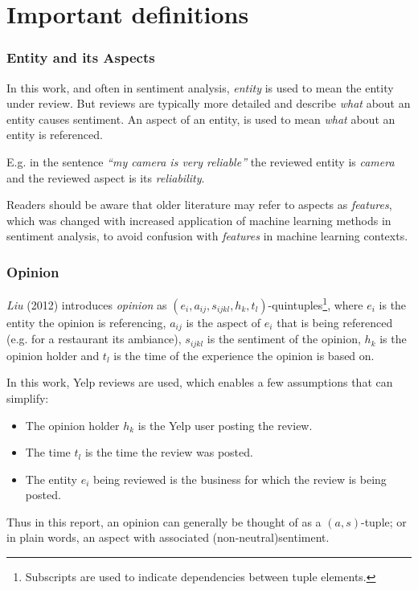 \documentclass[a4paper,11pt]{kth-mag}
\begin{document}
\clearpage

\section{Important definitions}

\subsubsection{Entity and its Aspects}
In this work, and often in sentiment analysis, \emph{entity} is used to mean the entity under review. But reviews are typically more detailed
and describe \emph{what} about an entity causes sentiment. An aspect of an entity, is used to mean \emph{what} about an entity is referenced.

E.g. in the sentence \emph{``my camera is very reliable''} the reviewed entity is \emph{camera} and the reviewed aspect is its \emph{reliability}.

Readers should be aware that older literature may refer to aspects as \emph{features}, which was changed with increased application of machine learning methods in sentiment analysis, to avoid confusion with \emph{features} in machine learning contexts.

\subsubsection{Opinion}
\emph{Liu} (2012) introduces \emph{opinion} as $(e_i,a_{ij},s_{ijkl},h_k,t_l)$-quintuples\footnote{Subscripts are
  used to indicate dependencies between tuple elements.},
where $e_i$ is the entity the opinion is referencing,
$a_{ij}$ is the aspect of $e_i$ that is being referenced (e.g. for a restaurant its ambiance),
$s_{ijkl}$ is the sentiment of the opinion,
$h_k$ is the opinion holder and
$t_l$ is the time of the experience the opinion is based on\cite[Chapter~2.1]{liu2012sentiment}.

In this work, Yelp reviews are used, which enables a few assumptions that can simplify:
\begin{itemize}
\item The opinion holder $h_k$ is the Yelp user posting the review.
\item The time $t_l$ is the time the review was posted.
\item The entity $e_i$ being reviewed is the business for which the review is being posted.
\end{itemize}

Thus in this report, an opinion can generally be thought of as a $(a,s)$-tuple; or in plain words, an aspect with associated (non-neutral)sentiment.
\end{document}
